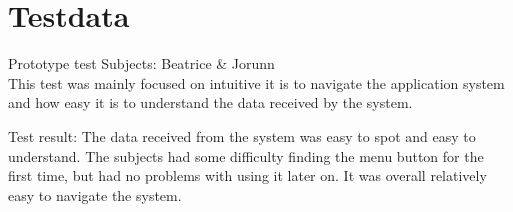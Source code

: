\section{Testdata}
Prototype test
Subjects: Beatrice \& Jorunn
\\
This test was mainly focused on intuitive it is to navigate the application system and how easy it is to understand the data received by the system. 

Test result:
The data received from the system was easy to spot and easy to understand. The subjects had some difficulty finding the menu button for the first time, but had no problems with using it later on. It was overall relatively easy to navigate the system. 